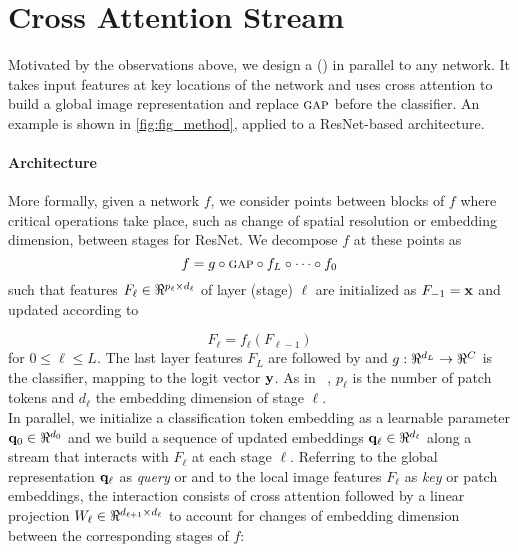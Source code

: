 \section{Cross Attention Stream}

\label{sec:ca_design}
Motivated by the observations above, we design a \emph{\OURS} (\emph{\Ours}) in parallel to any 
network. It takes input features at key locations of the network and uses cross attention to build 
a global image representation and replace ${\textsc{gap}}$ before the classifier. An example is shown in 
\autoref{fig:fig_method}, applied to a ResNet-based architecture.

\paragraph{Architecture}
More formally, given a network $f$, we consider points between blocks of $f$ where critical 
operations take place, such as change of spatial resolution or embedding dimension, \eg between 
stages for ResNet. We decompose $f$ at these points as
\begin{equation}
	f = g \circ {\textsc{gap}} \circ f_L \circ \dots \circ f_0
\label{eq:f-decomp}
\end{equation}
such that features $F_\ell \in \real^{p_\ell \times d_\ell}$ of layer (stage) $\ell$ are 
initialized as $F_{-1} = \mathbf{x}$ and updated according to

\begin{equation}
	F_\ell = f_\ell(F_{\ell-1})
\label{eq:f-layer}
\end{equation}
for $0 \le \ell \le L$. The last layer features $F_L$ are followed by \gap and $g: \real^{d_L} \to 
\real^C$ is the classifier, mapping to the logit vector $\mathbf{y}$. As in ~, 
$p_\ell$ is the number of patch tokens and $d_\ell$ the embedding dimension of stage $\ell$.\\

\noindent In parallel, we initialize a classification token embedding as a learnable parameter 
$\vq_0 \in \real^{d_0}$ and we build a sequence of updated embeddings $\vq_\ell \in \real^{d_\ell}$ 
along a stream that interacts with $F_\ell$ at each stage $\ell$. Referring to the global 
representation $\mathbf{q}_\ell$ as \emph{query} or \cls and to the local image features $F_\ell$ as 
\emph{key} or patch embeddings, the interaction consists of cross attention followed by a linear 
projection $W_\ell \in \real^{d_{\ell+1} \times d_\ell}$ to account for changes of embedding 
dimension between the corresponding stages of $f$:

